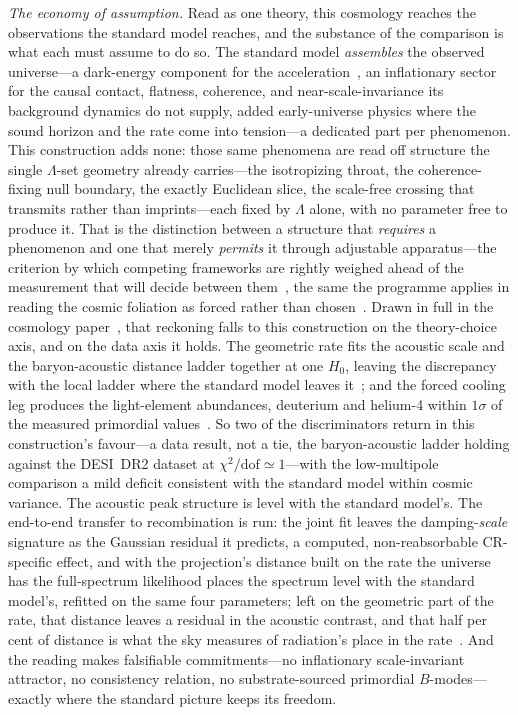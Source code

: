 \documentclass[11pt,a4paper]{article}
\theoremstyle{plain}
\theoremstyle{definition}
\theoremstyle{remark}
\begin{document}
\emph{The economy of assumption.} Read as one theory, this cosmology reaches the observations the standard model reaches, and the substance of the comparison is what each must assume to do so. The standard model \emph{assembles} the observed universe---a dark-energy component for the acceleration~\cite{Riess1998,Perlmutter1999}, an inflationary sector for the causal contact, flatness, coherence, and near-scale-invariance its background dynamics do not supply, added early-universe physics where the sound horizon and the rate come into tension---a dedicated part per phenomenon. This construction adds none: those same phenomena are read off structure the single $\Lambda$-set geometry already carries---the isotropizing throat, the coherence-fixing null boundary, the exactly Euclidean slice, the scale-free crossing that transmits rather than imprints---each fixed by $\Lambda$ alone, with no parameter free to produce it. That is the distinction between a structure that \emph{requires} a phenomenon and one that merely \emph{permits} it through adjustable apparatus---the criterion by which competing frameworks are rightly weighed ahead of the measurement that will decide between them~\cite{JanzenShadowExistence}, the same the programme applies in reading the cosmic foliation as forced rather than chosen~\cite{JanzenModernParallax}. Drawn in full in the cosmology paper~\cite{JanzenCRcosmology}, that reckoning falls to this construction on the theory-choice axis, and on the data axis it holds. The geometric rate fits the acoustic scale and the baryon-acoustic distance ladder together at one $H_0$, leaving the discrepancy with the local ladder where the standard model leaves it~\cite{JanzenCRcosmology}; and the forced cooling leg produces the light-element abundances, deuterium and helium-4 within $1\sigma$ of the measured primordial values~\cite{JanzenCosmogenesis}. So two of the discriminators return in this construction's favour---a data result, not a tie, the baryon-acoustic ladder holding against the DESI~DR2 dataset at $\chi^2/\text{dof}\simeq1$---with the low-multipole comparison a mild deficit consistent with the standard model within cosmic variance. The acoustic peak structure is level with the standard model's. The end-to-end transfer to recombination is run: the joint fit leaves the damping-\emph{scale} signature as the Gaussian residual it predicts, a computed, non-reabsorbable CR-specific effect, and with the projection's distance built on the rate the universe has the full-spectrum likelihood places the spectrum level with the standard model's, refitted on the same four parameters; left on the geometric part of the rate, that distance leaves a residual in the acoustic contrast, and that half per cent of distance is what the sky measures of radiation's place in the rate~\cite{JanzenCRcosmology}. And the reading makes falsifiable commitments---no inflationary scale-invariant attractor, no consistency relation, no substrate-sourced primordial $B$-modes---exactly where the standard picture keeps its freedom.
\end{document}
